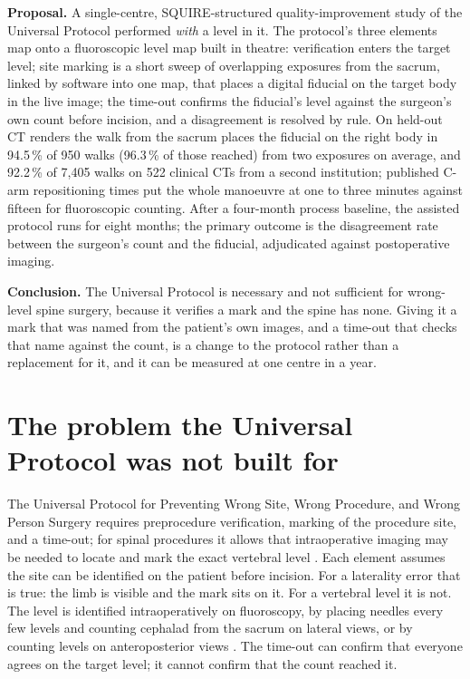\documentclass[11pt,letterpaper]{article}
\begin{document}
\noindent\textbf{Proposal.} A single-centre, SQUIRE-structured quality-improvement study of the Universal
Protocol performed \emph{with} a level in it. The protocol's three elements map onto a fluoroscopic level
map built in theatre: verification enters the target level; site marking is a short sweep of overlapping
exposures from the sacrum, linked by software into one map, that places a digital fiducial on the target
body in the live image; the time-out confirms the fiducial's level against the surgeon's own count before
incision, and a disagreement is resolved by rule. On held-out CT renders the walk from the sacrum places
the fiducial on the right body in 94.5\,\% of 950 walks (96.3\,\% of those reached) from two exposures on
average, and 92.2\,\% of 7,405 walks on 522 clinical CTs from a second institution; published C-arm
repositioning times put the whole manoeuvre at one to three minutes against fifteen for fluoroscopic
counting. After a four-month process baseline, the assisted protocol runs for eight months; the primary
outcome is the disagreement rate between the surgeon's count and the fiducial, adjudicated against
postoperative imaging.

\noindent\textbf{Conclusion.} The Universal Protocol is necessary and not sufficient for wrong-level
spine surgery, because it verifies a mark and the spine has none. Giving it a mark that was named from
the patient's own images, and a time-out that checks that name against the count, is a change to the
protocol rather than a replacement for it, and it can be measured at one centre in a year.

\section*{The problem the Universal Protocol was not built for}
The Universal Protocol for Preventing Wrong Site, Wrong Procedure, and Wrong Person Surgery requires
preprocedure verification, marking of the procedure site, and a time-out; for spinal procedures it
allows that intraoperative imaging may be needed to locate and mark the exact vertebral level
\citep{jcnpsg2025}. Each element
assumes the site can be identified on the patient before incision. For a laterality error that is true:
the limb is visible and the mark sits on it. For a vertebral level it is not. The level is identified
intraoperatively on fluoroscopy, by placing needles every few levels and counting cephalad from the
sacrum on lateral views, or by counting levels on anteroposterior views \citep{strong2021,mayer2008}. The time-out can confirm that everyone agrees on the target level; it
cannot confirm that the count reached it.
\end{document}

